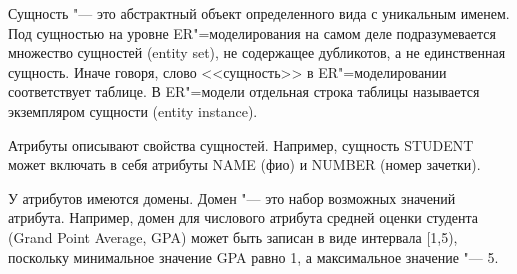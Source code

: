 Сущность "--- это абстрактный объект определенного вида с уникальным именем.
Под сущностью на уровне ER"=моделирования на самом деле
подразумевается множество сущностей (entity set), не содержащее дубликотов, а не единственная 
сущность. Иначе говоря, слово <<сущность>> в ER"=моделировании соответствует таблице. В ER"=модели
отдельная строка таблицы называется экземпляром сущности (entity instance).

Атрибуты описывают свойства сущностей. Например, сущность STUDENT может включать в себя атрибуты
NAME (фио) и NUMBER (номер зачетки).

У атрибутов имеются домены. Домен "--- это набор возможных значений атрибута. Например, домен для
числового атрибута средней оценки студента (Grand Point Average, GPA) может быть записан в виде интервала
[1,5), поскольку минимальное значение GPA равно 1, а максимальное значение "--- 5.